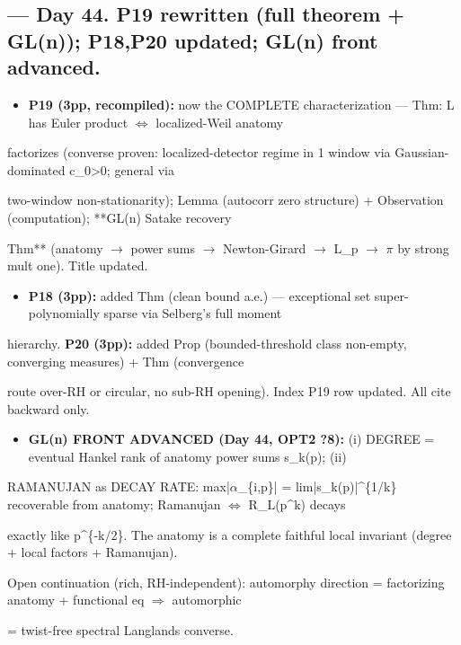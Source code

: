 \documentclass[10pt]{article}
\begin{document}
\subsection*{ --- Day 44. P19 rewritten (full theorem + GL(n)); P18,P20 updated; GL(n) front advanced.}
\begin{itemize}
\item \textbf{P19 (3pp, recompiled):} now the COMPLETE characterization --- Thm: L has Euler product \ensuremath{\iff} localized-Weil anatomy
\end{itemize}
  factorizes (converse proven: localized-detector regime in 1 window via Gaussian-dominated c\_0>0; general via\par
  two-window non-stationarity); Lemma (autocorr zero structure) + Observation (computation); **GL(n) Satake recovery\par
  Thm** (anatomy \ensuremath{\to} power sums \ensuremath{\to} Newton-Girard \ensuremath{\to} L\_p \ensuremath{\to} \ensuremath{\pi} by strong mult one). Title updated.\par
\begin{itemize}
\item \textbf{P18 (3pp):} added Thm (clean bound a.e.) --- exceptional set super-polynomially sparse via Selberg's full moment
\end{itemize}
  hierarchy. \textbf{P20 (3pp):} added Prop (bounded-threshold class non-empty, converging measures) + Thm (convergence\par
  route over-RH or circular, no sub-RH opening). Index P19 row updated. All cite backward only.\par
\begin{itemize}
\item \textbf{GL(n) FRONT ADVANCED (Day 44, OPT2 ?8):} (i) DEGREE = eventual Hankel rank of anatomy power sums s\_k(p); (ii)
\end{itemize}
  RAMANUJAN as DECAY RATE: max|\ensuremath{\alpha}\_\{i,p\}| = lim|s\_k(p)|\textasciicircum{}\{1/k\} recoverable from anatomy; Ramanujan \ensuremath{\iff} R\_L(p\textasciicircum{}k) decays\par
  exactly like p\textasciicircum{}\{-k/2\}. The anatomy is a complete faithful local invariant (degree + local factors + Ramanujan).\par
  Open continuation (rich, RH-independent): automorphy direction = factorizing anatomy + functional eq \ensuremath{\Rightarrow} automorphic\par
  = twist-free spectral Langlands converse.\par
\end{document}
